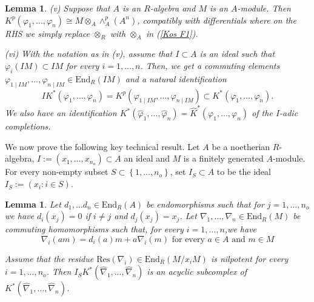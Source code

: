 \documentclass[asterisque,english]{smfart}
\newtheorem{lemma}[theo]{Lemma}
\begin{document}
\begin{lemma}
\smallskip


(v) Suppose that $A$ is an $R$-algebra and $M$ is an $A$-module. Then $K^{p}\left( \varphi
_{1},\ldots,\varphi _{n}\right) \cong M\otimes _{A}\wedge _{A}^{p}\left(
A^{n}\right) $, compatibly with differentials where on the RHS we simply replace $\otimes _{R}$ with $\otimes _{A}$ in (\ref{Kos F1}).


(vi) With the notation as in (v), assume that $I\subset A$ is an ideal such that $\varphi
_{i}\left( IM\right) \subset IM$ for every $i=1,\ldots,n$. Then, we get a
commuting elements $\varphi _{1\mid IM},\ldots,\varphi _{n\mid
IM}\in \mathrm{End}_{R}\left( IM\right) $ and a natural identification $$IK^{\ast
}\left( \varphi _{1},\ldots,\varphi _{n}\right) =K^{p}\left( \varphi _{1\mid IM},\ldots,\varphi _{n\mid IM}\right) \subset K^\ast\left(
\varphi _{1},\ldots,\varphi _{n}\right) .$$We also have an identification $K^\ast\left( \widehat{\varphi }_{1},\ldots,\widehat{\varphi }
_{n}\right) =\widehat{K}^\ast\left( \varphi _{1},\ldots,\varphi _{n}\right) 
$ of the $I$-adic completions.

\end{lemma}

We now prove the following key technical result. Let $A$ be a noetherian $R$-algebra, $I:=\left(
x_{1},\ldots,x_{n_{o}}\right) \subset A$ an ideal and
$M$ is a finitely generated $A$-module.   For every non-empty subset $S\subset \left\{
1,\ldots,n_{o}\right\} $, set $I_{S}\subset A$ to be the ideal $I_S:=\left( x_{i}:i\in S\right) $.


\begin{lemma}\label{lemma:Kos L1} 
Let $d_{1},\ldots d_{n}\in \mathrm{End}_{R}(
A) $  be endomorphisms such that for $j=1,\ldots,n_{o}$ we have  $d_{i}\left( x_{j}\right) =0$ if $i\neq j$ and $d_{j}\left( x_{j}\right) =x_{j}$. Let $ \nabla _{1},\ldots,\nabla _{n}\in \mathrm{End}_{R}(M) $ be commuting homomorphisms such that, for every $i=1,\ldots,n$,we have
\begin{equation}
\nabla _{i}\left( am\right) =d_{i}\left( a\right) m+a\nabla _{i}\left(
m\right) \text{ for every }a\in A\text{ and }m\in M  \label{Kos L1 F1 Clm}
\end{equation}

Assume that the residue $\mathrm{Res}(\nabla _{i})\in \mathrm{End}_R(M/x_i M)$ is
nilpotent for every $i=1,\ldots,n_{o}$.  Then  $I_{S}K^\ast\left( 
\widehat{\nabla }_{1},\ldots,\widehat{\nabla }_{n}\right) $ is an acyclic
subcomplex of $K^\ast\left( \widehat{\nabla }_{1},\ldots,\widehat{
\nabla }_{n}\right) $.  
\end{lemma}
\end{document}
